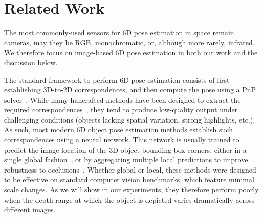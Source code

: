 
\section{Related Work}
\label{sec:related}

The most commonly-used sensors for 6D pose estimation in space remain cameras, may they be RGB, monochromatic, or, although more rarely, infrared. 
We therefore focus on image-based 6D pose estimation in both our work and the discussion below.

The standard framework to perform 6D pose estimation consists of first establishing 3D-to-2D correspondences, and then compute the pose using a PnP solver~\cite{Lu00,Tulsiani15,Pavlakos17a}. While many hancrafted methods have been designed to extract the required correspondences~\cite{Lowe04,Tola10,Trzcinski12c}, they tend to produce low-quality output under challenging conditions (objects lacking spatial variation, strong highlights, etc.). As such, most modern 6D object pose estimation methods establish such correspondences using a neural network. This network is usually trained to predict the image location of the 3D object bounding box corners, either in a single global fashion~\cite{Kehl17,Rad17,Tekin18a,Xiang18b}, or by aggregating multiple local predictions to improve robustness to occlusions~\cite{Oberweger18,Jafari18,Hu19a,Peng19a,Zakharov19a,Li19a}. 
Whether global or local, these methods were designed to be effective on standard computer vision benchmarks, which feature minimal scale changes. As we will show in our experiments, they therefore perform poorly when the depth range at which the object is depicted varies dramatically across different images.

